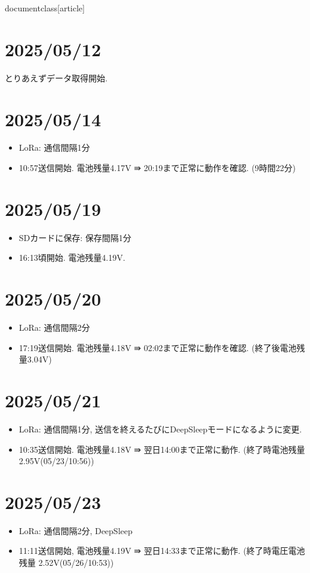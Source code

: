 documentclass[article]



\section{2025/05/12}
とりあえずデータ取得開始.


\section{2025/05/14}
\begin{itemize}
    \item LoRa: 通信間隔1分
    \item 10:57送信開始. 電池残量4.17V ⇛ 20:19まで正常に動作を確認. (9時間22分)
\end{itemize}

\section{2025/05/19}
\begin{itemize}
    \item SDカードに保存: 保存間隔1分
    \item 16:13頃開始. 電池残量4.19V.
\end{itemize}

\section{2025/05/20}
\begin{itemize}
    \item LoRa: 通信間隔2分
    \item 17:19送信開始. 電池残量4.18V ⇛ 02:02まで正常に動作を確認. (終了後電池残量3.04V)
\end{itemize}

\section{2025/05/21}
\begin{itemize}
    \item LoRa: 通信間隔1分, 送信を終えるたびにDeepSleepモードになるように変更.
    \item 10:35送信開始. 電池残量4.18V ⇛ 翌日14:00まで正常に動作. (終了時電池残量2.95V(05/23/10:56))
\end{itemize}

\section{2025/05/23}
\begin{itemize}
    \item LoRa: 通信間隔2分, DeepSleep
    \item 11:11送信開始, 電池残量4.19V ⇛ 翌日14:33まで正常に動作.  (終了時電圧電池残量 2.52V(05/26/10:53))
\end{itemize}

